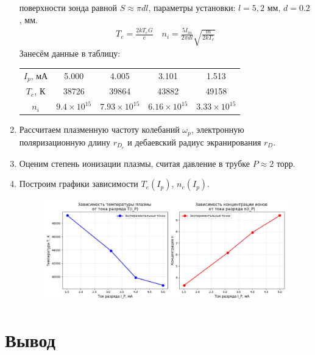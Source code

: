 \documentclass[a4paper, 12pt]{article}
\begin{document}
\begin{enumerate}
    поверхности зонда равной $S \approx \pi dl$, параметры установки: $l = 5,2$ мм, $d = 0.2$, мм.
    \begin{align*}
        T_{e} = \frac{2kT_{e}G}{e} \quad n_{i} = \frac{5I_{in}}{2\pi dl}\sqrt{\frac{m}{2kT_{e}}}
    \end{align*}
    Занесём данные в таблицу:
    \begin{center}
        \begin{tabular}{|c|c|c|c|c|}
            \hline
            $I_{p}$, мА & 5.000 & 4.005 & 3.101 & 1.513\\
            $T_{e}$, К & 38726 & 39864 & 43882 & 49158\\
            $n_{i}$ & $9.4\times 10^{15}$ & $7.93\times 10^{15}$ & $6.16\times 10^{15}$ & $3.33\times 10^{15}$\\
            \hline
        \end{tabular}
    \end{center}
    \item Рассчитаем плазменную частоту колебаний $\omega_{p}$, электронную поляризационную длину $r_{D_{e}}$ и дебаевский радиус экранирования $r_{D}$.
    \item Оценим степень ионизации плазмы, считая давление в трубке $P \approx 2$ торр.
    \item Построим графики зависимости $T_{e}(I_{p})$, $n_{e}(I_{p})$.
    \begin{figure}[htbp]
        \centering
        \includegraphics[width=0.8\linewidth]{last.png}
    \end{figure}
\end{enumerate}
\section*{Вывод}
\end{document}
